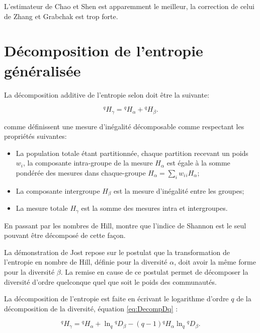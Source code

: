 \documentclass[
  11pt,
  french,
  a4paper,
  extrafontsizes,onecolumn,openright
  ]{memoir}
\providecommand{\tightlist}{%
  \setlength{\itemsep}{0pt}\setlength{\parskip}{0pt}}
\begin{document}
\normalsize

L'estimateur de Chao et Shen est apparemment le meilleur, la correction de celui de Zhang et Grabchak est trop forte.

\section{Décomposition de l'entropie généralisée}\label{duxe9composition-de-lentropie-guxe9nuxe9ralisuxe9e}

La décomposition additive de l'entropie selon \textcite{Lande1996} doit être la suivante:

\begin{equation}
  \label{eq:DecompHq}
  ^{q}\!H_{\gamma} = {^{q}\!H_{\alpha}} + {^{q}\!H_{\beta}}.
\end{equation}

\textcite{Bourguignon1979} comme \textcite{Lande1996} définissent une mesure d'inégalité décomposable comme respectant les propriétés suivantes:

\begin{itemize}
\tightlist
\item
  La population totale étant partitionnée, chaque partition recevant un poids \(w_i\), la composante intra-groupe de la mesure \(H_{\alpha}\) est égale à la somme pondérée des mesures dans chaque-groupe \(H_{\alpha}=\sum_i{w_i {_{i}\!H_{\alpha}}}\);
\item
  La composante intergroupe \(H_{\beta}\) est la mesure d'inégalité entre les groupes;
\item
  La mesure totale \(H_{\gamma}\) est la somme des mesures intra et intergroupes.
\end{itemize}

En passant par les nombres de Hill, \textcite{Jost2007} montre que l'indice de Shannon est le seul pouvant être décomposé de cette façon.

La démonstration de Jost repose sur le postulat que la transformation de l'entropie en nombre de Hill, définie pour la diversité \(\alpha\), doit avoir la même forme pour la diversité \(\beta\).
La remise en cause de ce postulat \autocite{Marcon2014a} permet de décomposer la diversité d'ordre quelconque quel que soit le poids des communautés.

La décomposition de l'entropie est faite en écrivant le logarithme d'ordre \(q\) de la décomposition de la diversité, équation \eqref{eq:DecompDq} :

\begin{equation}
  \label{eq:DecompJost}
  ^{q}\!H_{\gamma} = {^{q}\!H_{\alpha}}+\ln_q{^{q}\!D_{\beta}}-\left(q-1\right){^{q}\!H_{\alpha}}\ln_q{^{q}\!D_{\beta}}.
\end{equation}
\end{document}
